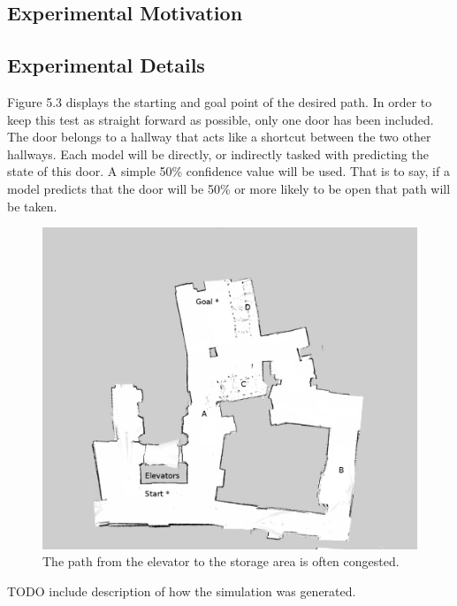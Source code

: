 \subsection{ Experimental Motivation }



\subsection{ Experimental Details }

Figure 5.3 displays the starting and goal point of the
desired path. In order to keep this test as straight forward as possible, only
one door has been included. The door belongs to a hallway that acts like a
shortcut between the two other hallways. Each model will be directly, or
indirectly tasked with predicting the state of this door. A simple 50\%
confidence value will be used. That is to say, if a model predicts that the
door will be 50\% or more likely to be open that path will be taken. \\


\begin{figure}[!htb]
  \centering
  \includegraphics[width=\linewidth]{images/basement_congestion.png}
  \caption{The path from the elevator to the storage area is often congested. }
  \label{figure:basement_congestion}
\end{figure}


TODO include description of how the simulation was generated.
